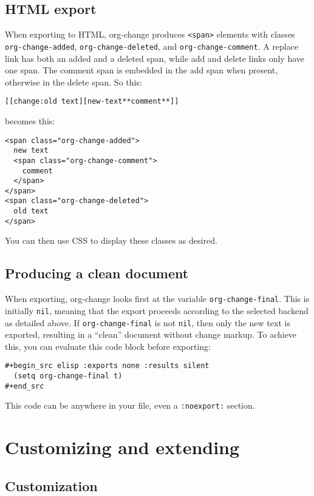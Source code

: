 \documentclass[11pt]{article}
\begin{document}
\subsection{HTML export}
\label{sec:org98ae360}

When exporting to HTML, org-change produces \texttt{<span>} elements with
classes \texttt{org-change-added}, \texttt{org-change-deleted}, and
\texttt{org-change-comment}. A replace link has both an added and a deleted
span, while add and delete links only have one span. The comment span
is embedded in the add span when present, otherwise in the delete
span. So this:
\begin{verbatim}
[[change:old text][new-text**comment**]]
\end{verbatim}
becomes this:
\begin{verbatim}
<span class="org-change-added">
  new text
  <span class="org-change-comment">
    comment
  </span>
</span>
<span class="org-change-deleted">
  old text
</span>
\end{verbatim}
You can then use CSS to display these classes as desired.

\subsection{Producing a clean document}
\label{sec:org709676f}

When exporting, org-change looks first at the variable
\texttt{org-change-final}. This is initially \texttt{nil}, meaning that the export
proceeds according to the selected backend as detailed above. If
\texttt{org-change-final} is not \texttt{nil}, then only the new text is exported,
resulting in a ``clean'' document without change markup. To achieve
this, you can evaluate this code block before exporting:
\begin{verbatim}
#+begin_src elisp :exports none :results silent
  (setq org-change-final t)
#+end_src
\end{verbatim}
This code can be anywhere in your file, even a \texttt{:noexport:} section.

\section{Customizing and extending}
\label{sec:org0e35391}
\subsection{Customization}
\label{sec:org7e54231}
\end{document}
